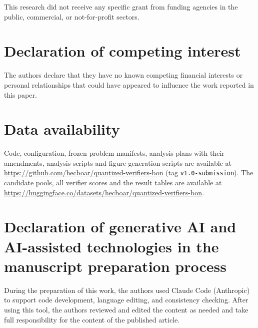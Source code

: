 This research did not receive any specific grant from funding agencies in the public,
commercial, or not-for-profit sectors.

\section*{Declaration of competing interest}

The authors declare that they have no known competing financial interests or personal
relationships that could have appeared to influence the work reported in this paper.

\section*{Data availability}

Code, configuration, frozen problem manifests, analysis plans with their amendments,
analysis scripts and figure-generation scripts are available at
\url{https://github.com/hecboar/quantized-verifiers-bon} (tag \texttt{v1.0-submission}).
The candidate pools, all verifier scores and the result tables are available at
\url{https://huggingface.co/datasets/hecboar/quantized-verifiers-bon}.

\section*{Declaration of generative AI and AI-assisted technologies in the manuscript
preparation process}

During the preparation of this work, the authors used Claude Code (Anthropic) to support
code development, language editing, and consistency checking. After using this tool, the
authors reviewed and edited the content as needed and take full responsibility for the
content of the published article.
